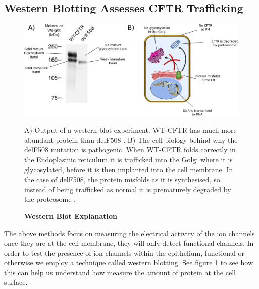 \subsection{Western Blotting Assesses CFTR Trafficking}
\begin{figure}
	\label{western_blot}
	\begin{center}
	\includegraphics[width=1\textwidth]{figures/western_blot_explanation.pdf}
	\end{center}
	\captionsetup{singlelinecheck = false, justification=raggedright}
	\caption[Western Blot Explanation] {\textbf{Western Blot Explanation}}{A) Output of a western blot experiment. WT-CFTR has much more abundant protein than delF508 \cite{chang2008}. B) The cell biology behind why the delF508 mutation is pathogenic. When WT-CFTR folds correctly in the Endoplasmic reticulum it is trafficked into the Golgi where it is glycosylated, before it is then implanted into the cell membrane. In the case of delF508, the protein misfolds as it is synthesised, so instead of being trafficked as normal it is prematurely degraded by the proteosome \cite{lopes-pacheco2016a}.} 
\end{figure}
The above methods focus on measuring the electrical activity of the ion channels once they are at the cell membrane, they will only detect functional channels. In order to test the presence of ion channels within the epithelium, functional or otherwise we employ a technique called western blotting. See figure \ref{western_blot} to see how this can help us understand how measure the amount of protein at the cell surface. 

